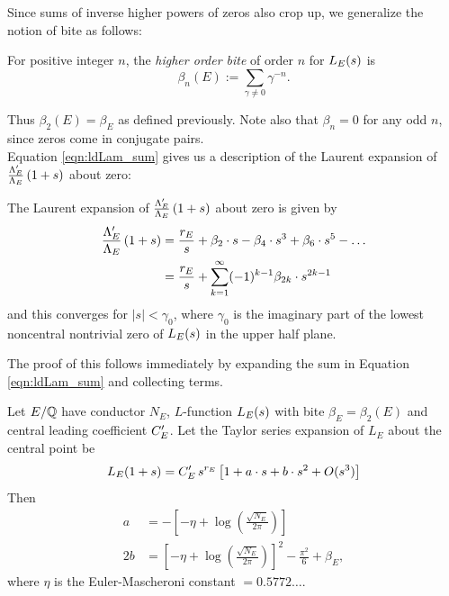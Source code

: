 Since sums of inverse higher powers of zeros also crop up, we generalize the notion of bite as follows:
\begin{definition}
For positive integer $n$, the {\it higher order bite} of order $n$ for $L_E(s)$ is
\begin{equation}
\beta_n(E) := \sum_{\gamma \ne 0} \gamma^{-n}.
\end{equation}
\end{definition}
Thus $\beta_2(E) = \beta_E$ as defined previously. Note also that $\beta_n = 0$ for any odd $n$, since zeros come in conjugate pairs. \\

Equation \ref{eqn:ldLam_sum} gives us a description of the Laurent expansion of $\frac{\Lambda_E^{\prime}}{\Lambda_E}\left(1+s\right)$ about zero:
\begin{corollary}\label{cor:ldLam_series_at_zero}
The Laurent expansion of $\frac{\Lambda_E^{\prime}}{\Lambda_E}\left(1+s\right)$ about zero is given by
\begin{align}
\frac{\Lambda_E^{\prime}}{\Lambda_E}\left(1+s\right) &= \frac{r_E}{s} + \beta_2\cdot s - \beta_4\cdot s^3 + \beta_6\cdot  s^5 - \ldots \\
& = \frac{r_E}{s} + \sum_{k=1}^{\infty} (-1)^{k-1}\beta_{2k}\cdot s^{2k-1}
\end{align}
and this converges for $|s|<\gamma_0$, where $\gamma_0$ is the imaginary part of the lowest noncentral nontrivial zero of $L_E(s)$ in the upper half plane.
\end{corollary}
The proof of this follows immediately by expanding the sum in Equation \ref{eqn:ldLam_sum} and collecting terms. \\

\begin{corollary}\label{cor:ldLe_expansion}
Let $E/\mathbb{Q}$ have conductor $N_E$, $L$-function $L_E(s)$ with bite $\beta_E = \beta_2(E)$ and central leading coefficient $C_E^{\prime}$. Let the Taylor series expansion of $L_E$ about the central point be
\begin{equation}
L_E(1+s) = C_E^{\prime} \, s^{r_E}\left[1 + a\cdot s + b\cdot s^2 + O(s^3)\right]
\end{equation}
Then 
\begin{align}
a &= -\left[-\eta + \log\left(\frac{\sqrt{N_E}}{2\pi}\right)\right] \\
2b &= \left[-\eta + \log\left(\frac{\sqrt{N_E}}{2\pi}\right)\right]^2 - \frac{\pi^2}{6} + \beta_E,
\end{align}
where $\eta$ is the Euler-Mascheroni constant $= 0.5772\ldots$.
\end{corollary}

